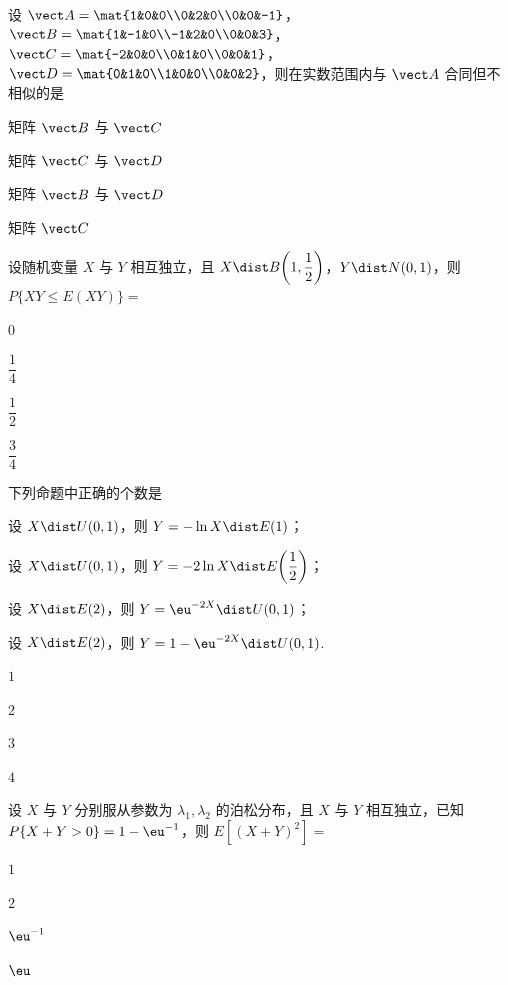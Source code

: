 \begin{question}[index=7]
设 $\vect A=\mat{1&0&0\\0&2&0\\0&0&-1}$，$\vect B=\mat{1&-1&0\\-1&2&0\\0&0&3}$，$\vect C=\mat{-2&0&0\\0&1&0\\0&0&1}$，$\vect D=\mat{0&1&0\\1&0&0\\0&0&2}$，则在实数范围内与 $\vect A$ 合同但不相似的是
\begin{choices}[columns=2]
\item 矩阵 $\vect B$ 与 $\vect C$
\item 矩阵 $\vect C$ 与 $\vect D$
\item 矩阵 $\vect B$ 与 $\vect D$
\item 矩阵 $\vect C$
\end{choices}
\end{question}
\QuestionBreak

\begin{question}[index=8]
设随机变量 $X$ 与 $Y$ 相互独立，且 $X\dist B\!\left(1,\dfrac12\right)$，$Y\dist N(0,1)$，则 $P\{XY\le E(XY)\}=$
\begin{choices}[columns=4]
\item $0$
\item $\dfrac14$
\item $\dfrac12$
\item $\dfrac34$
\end{choices}
\end{question}
\QuestionBreak

\begin{question}[index=9]
下列命题中正确的个数是
\par{} 设 $X\dist U(0,1)$，则 $Y=-\ln X\dist E(1)$；
\par{} 设 $X\dist U(0,1)$，则 $Y=-2\ln X\dist E\!\left(\dfrac12\right)$；
\par{} 设 $X\dist E(2)$，则 $Y=\eu^{-2X}\dist U(0,1)$；
\par{} 设 $X\dist E(2)$，则 $Y=1-\eu^{-2X}\dist U(0,1)$.
\begin{choices}[columns=4]
\item $1$
\item $2$
\item $3$
\item $4$
\end{choices}
\end{question}
\QuestionBreak

\begin{question}[index=10]
设 $X$ 与 $Y$ 分别服从参数为 $\lambda_1,\lambda_2$ 的泊松分布，且 $X$ 与 $Y$ 相互独立，已知 $P\{X+Y>0\}=1-\eu^{-1}$，则 $E[(X+Y)^2]=$
\begin{choices}[columns=4]
\item $1$
\item $2$
\item $\eu^{-1}$
\item $\eu$
\end{choices}
\end{question}
